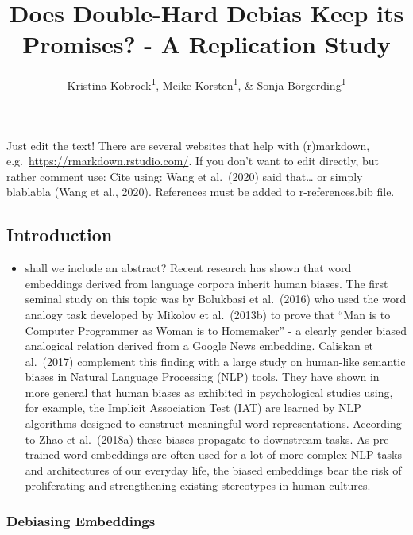 \documentclass[
  english,
  man,floatsintext]{apa6}
\title{Does Double-Hard Debias Keep its Promises? - A Replication Study}
\author{Kristina Kobrock\textsuperscript{1}, Meike Korsten\textsuperscript{1}, \& Sonja Börgerding\textsuperscript{1}}
\date{}
\affiliation{\vspace{0.5cm}\textsuperscript{1} University of Osnabrück}
\providecommand{\tightlist}{%
  \setlength{\itemsep}{0pt}\setlength{\parskip}{0pt}}
\begin{document}
\maketitle

Just edit the text! There are several websites that help with (r)markdown, e.g.~\url{https://rmarkdown.rstudio.com/}.
If you don't want to edit directly, but rather comment use:
Cite using: Wang et al.~(2020) said that\ldots{} or simply blablabla (Wang et al., 2020). References must be added to r-references.bib file.

\hypertarget{introduction}{%
\subsection{Introduction}\label{introduction}}

\begin{itemize}
\tightlist
\item
  shall we include an abstract?
  Recent research has shown that word embeddings derived from language corpora inherit human biases. The first seminal study on this topic was by Bolukbasi et al.~(2016) who used the word analogy task developed by Mikolov et al.~(2013b) to prove that \enquote{Man is to Computer Programmer as Woman is to Homemaker} - a clearly gender biased analogical relation derived from a Google News embedding. Caliskan et al.~(2017) complement this finding with a large study on human-like semantic biases in Natural Language Processing (NLP) tools. They have shown in more general that human biases as exhibited in psychological studies using, for example, the Implicit Association Test (IAT) are learned by NLP algorithms designed to construct meaningful word representations. According to Zhao et al.~(2018a) these biases propagate to downstream tasks. As pre-trained word embeddings are often used for a lot of more complex NLP tasks and architectures of our everyday life, the biased embeddings bear the risk of proliferating and strengthening existing stereotypes in human cultures.
\end{itemize}

\hypertarget{debiasing-embeddings}{%
\subsubsection{Debiasing Embeddings}\label{debiasing-embeddings}}
\end{document}
